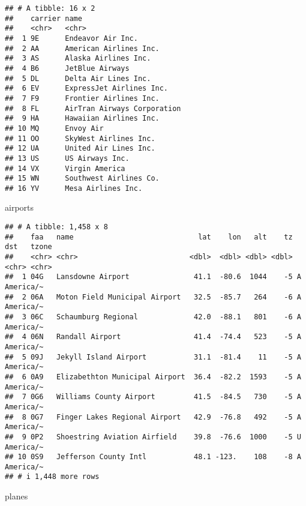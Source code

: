 \documentclass[
]{article}
\newenvironment{Shaded}{\begin{snugshade}}{\end{snugshade}}
\newcommand{\NormalTok}[1]{#1}
\begin{document}
\begin{verbatim}
## # A tibble: 16 x 2
##    carrier name                       
##    <chr>   <chr>                      
##  1 9E      Endeavor Air Inc.          
##  2 AA      American Airlines Inc.     
##  3 AS      Alaska Airlines Inc.       
##  4 B6      JetBlue Airways            
##  5 DL      Delta Air Lines Inc.       
##  6 EV      ExpressJet Airlines Inc.   
##  7 F9      Frontier Airlines Inc.     
##  8 FL      AirTran Airways Corporation
##  9 HA      Hawaiian Airlines Inc.     
## 10 MQ      Envoy Air                  
## 11 OO      SkyWest Airlines Inc.      
## 12 UA      United Air Lines Inc.      
## 13 US      US Airways Inc.            
## 14 VX      Virgin America             
## 15 WN      Southwest Airlines Co.     
## 16 YV      Mesa Airlines Inc.
\end{verbatim}

\begin{Shaded}
\begin{Highlighting}[]
\NormalTok{airports}
\end{Highlighting}
\end{Shaded}

\begin{verbatim}
## # A tibble: 1,458 x 8
##    faa   name                             lat    lon   alt    tz dst   tzone    
##    <chr> <chr>                          <dbl>  <dbl> <dbl> <dbl> <chr> <chr>    
##  1 04G   Lansdowne Airport               41.1  -80.6  1044    -5 A     America/~
##  2 06A   Moton Field Municipal Airport   32.5  -85.7   264    -6 A     America/~
##  3 06C   Schaumburg Regional             42.0  -88.1   801    -6 A     America/~
##  4 06N   Randall Airport                 41.4  -74.4   523    -5 A     America/~
##  5 09J   Jekyll Island Airport           31.1  -81.4    11    -5 A     America/~
##  6 0A9   Elizabethton Municipal Airport  36.4  -82.2  1593    -5 A     America/~
##  7 0G6   Williams County Airport         41.5  -84.5   730    -5 A     America/~
##  8 0G7   Finger Lakes Regional Airport   42.9  -76.8   492    -5 A     America/~
##  9 0P2   Shoestring Aviation Airfield    39.8  -76.6  1000    -5 U     America/~
## 10 0S9   Jefferson County Intl           48.1 -123.    108    -8 A     America/~
## # i 1,448 more rows
\end{verbatim}

\begin{Shaded}
\begin{Highlighting}[]
\NormalTok{planes}
\end{Highlighting}
\end{Shaded}
\end{document}
